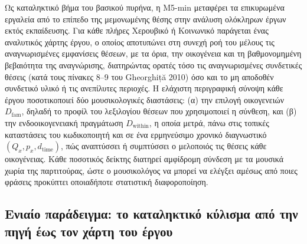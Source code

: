 \documentclass[11pt,a4paper]{article}
\begin{document}
Ως καταληκτικό βήμα του βασικού πυρήνα, η Μ5-min μεταφέρει τα επικυρωμένα εργαλεία από το επίπεδο της μεμονωμένης θέσης στην ανάλυση ολόκληρων έργων εκτός εκπαίδευσης. Για κάθε πλήρες Χερουβικό ή Κοινωνικό παράγεται ένας αναλυτικός χάρτης έργου, ο οποίος αποτυπώνει στη συνεχή ροή του μέλους τις αναγνωρισμένες εμφανίσεις θέσεων, με τα όρια, την οικογένεια και τη βαθμονομημένη βεβαιότητα της αναγνώρισης, διατηρώντας ορατές τόσο τις αναγνωρισμένες συνδετικές θέσεις (κατά τους πίνακες 8--9 του Gheorghiță 2010) όσο και το μη αποδοθέν συνδετικό υλικό ή τις ανεπίλυτες περιοχές. Η ελάχιστη περιγραφική σύνοψη κάθε έργου ποσοτικοποιεί δύο μουσικολογικές διαστάσεις: (α) την επιλογή οικογενειών $D_{\text{fam}}$, δηλαδή το προφίλ του λεξιλογίου θέσεων που χρησιμοποιεί η σύνθεση, και (β) την ενδοοικογενειακή πραγμάτωση $D_{\text{within}}$, η οποία μετρά, πάνω στις τοπικές καταστάσεις του κωδικοποιητή και σε ένα ερμηνεύσιμο χρονικό διαγνωστικό $(Q_x,p_x,d_{\text{time}})$, πώς αναπτύσσει ή συμπτύσσει ο μελοποιός τις θέσεις κάθε οικογένειας. Κάθε ποσοτικός δείκτης διατηρεί αμφίδρομη σύνδεση με τα μουσικά χωρία της παρτιτούρας, ώστε ο μουσικολόγος να μπορεί να ελέγξει αμέσως από ποιες φράσεις προκύπτει οποιαδήποτε στατιστική διαφοροποίηση.

\subsection*{Ενιαίο παράδειγμα: το καταληκτικό κύλισμα από την πηγή έως τον χάρτη του έργου}
\end{document}
